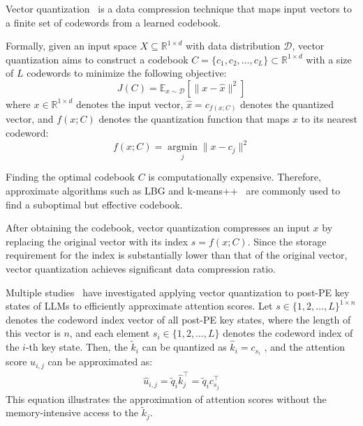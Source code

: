 Vector quantization~\citep{vector-quantization} is a data compression technique that maps input vectors to a finite set of codewords from a learned codebook.

Formally, given an input space \(X \subseteq \mathbb{R}^{1 \times d}\) with data distribution \(\mathcal D\),
vector quantization aims to construct a codebook \(C = \{c_1, c_2, \dots, c_L\} \subset \mathbb{R}^{1 \times d}\) with a size of \(L\) codewords to minimize the following objective:
\begin{equation}
    \label{eq:vq_objective}
    J(C) = \mathbb E_{x \sim \mathcal D}[ \| x - \hat x \|^2 ]
\end{equation}
where \(x \in \mathbb R^{1 \times d}\) denotes the input vector, \(\hat x = c_{f(x; C)}\) denotes the quantized vector, and \(f(x; C)\) denotes the quantization function that maps \(x\) to its nearest codeword:
\begin{equation}
    f(x; C) = \operatorname*{argmin}_j \| x - c_j \|^2
\end{equation} 

Finding the optimal codebook \(C\) is computationally expensive.
Therefore, approximate algorithms such as LBG and k-means++~\citep{lbg, kmeans++} are commonly used to find a suboptimal but effective codebook.

After obtaining the codebook, vector quantization compresses an input \(x\) by replacing the original vector with its index \(s = f(x; C)\).
Since the storage requirement for the index is substantially lower than that of the original vector, vector quantization achieves significant data compression ratio.

Multiple studies~\citep{transformer-vq, pqcache, clusterkv} have investigated applying vector quantization to post-PE key states of LLMs to efficiently approximate attention scores.
Let \(s \in \{1, 2, \dots, L\}^{1 \times n}\) denotes the codeword index vector of all post-PE key states, where the length of this vector is \(n\), and each element \(s_i \in \{ 1, 2, \dots, L \}\) denotes the codeword index of the \(i\)-th key state.
Then, the \(\tilde k_i\) can be quantized as \(\hat {k}_i = c_{s_i}\)
, and the attention score \(u_{i,j}\) can be approximated as:
\begin{align}
    \label{eq:attention_weights_approximation}
    \hat u_{i,j} = \tilde q_i \hat k_j^\top = \tilde q_i c^\top_{s_j}
\end{align}
This equation illustrates the approximation of attention scores without the memory-intensive access to the \(\tilde k_j\).

